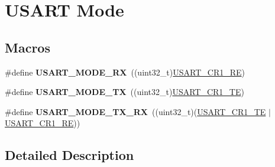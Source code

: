 \hypertarget{group___u_s_a_r_t___mode}{}\section{U\+S\+A\+RT Mode}
\label{group___u_s_a_r_t___mode}
\subsection*{Macros}
\begin{DoxyCompactItemize}
\item 
\#define {\bfseries U\+S\+A\+R\+T\+\_\+\+M\+O\+D\+E\+\_\+\+RX}~((uint32\+\_\+t)\hyperlink{group___peripheral___registers___bits___definition_gada0d5d407a22264de847bc1b40a17aeb}{U\+S\+A\+R\+T\+\_\+\+C\+R1\+\_\+\+RE})\hypertarget{group___u_s_a_r_t___mode_ga3efdc5989048ad122a5c9c1e325bb89c}{}\label{group___u_s_a_r_t___mode_ga3efdc5989048ad122a5c9c1e325bb89c}

\item 
\#define {\bfseries U\+S\+A\+R\+T\+\_\+\+M\+O\+D\+E\+\_\+\+TX}~((uint32\+\_\+t)\hyperlink{group___peripheral___registers___bits___definition_gade7f090b04fd78b755b43357ecaa9622}{U\+S\+A\+R\+T\+\_\+\+C\+R1\+\_\+\+TE})\hypertarget{group___u_s_a_r_t___mode_ga7a2fcdc3486d2675cc147811b996eb16}{}\label{group___u_s_a_r_t___mode_ga7a2fcdc3486d2675cc147811b996eb16}

\item 
\#define {\bfseries U\+S\+A\+R\+T\+\_\+\+M\+O\+D\+E\+\_\+\+T\+X\+\_\+\+RX}~((uint32\+\_\+t)(\hyperlink{group___peripheral___registers___bits___definition_gade7f090b04fd78b755b43357ecaa9622}{U\+S\+A\+R\+T\+\_\+\+C\+R1\+\_\+\+TE} $\vert$\hyperlink{group___peripheral___registers___bits___definition_gada0d5d407a22264de847bc1b40a17aeb}{U\+S\+A\+R\+T\+\_\+\+C\+R1\+\_\+\+RE}))\hypertarget{group___u_s_a_r_t___mode_ga82418ff60ab8dac647eb7a6ba6db1284}{}\label{group___u_s_a_r_t___mode_ga82418ff60ab8dac647eb7a6ba6db1284}

\end{DoxyCompactItemize}


\subsection{Detailed Description}
